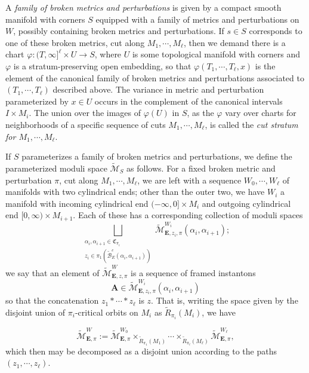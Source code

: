 \documentclass[10pt,a4paper]{amsart}
\theoremstyle{definition}
\theoremstyle{remark}
\numberwithin{figure}{qchap}
\begin{document}
A \emph{family of broken metrics and perturbations} is given by a compact smooth manifold with corners $S$ equipped with a family of metrics and perturbations on $W$, possibly containing broken metrics and perturbations. If $s \in S$ corresponds to one of these broken metrics, cut along $M_1, \cdots, M_\ell$, then we demand there is a chart $\varphi: (T, \infty]^\ell \times U \to S$, where $U$ is some topological manifold with corners and $\varphi$ is a stratum-preserving open embedding, so that $\varphi(T_1, \cdots, T_\ell, x)$ is the element of the canonical family of broken metrics and perturbations associated to $(T_1, \cdots, T_\ell)$ described above. The variance in metric and perturbation parameterized by $x \in U$ occurs in the complement of the canonical intervals $I \times M_i$. The union over the images of $\varphi(U)$ in $S$, as the $\varphi$ vary over charts for neighborhoods of a specific sequence of cuts $M_1, \cdots, M_\ell$, is called the \emph{cut stratum for $M_1, \cdots, M_\ell$}.

If $S$ parameterizes a family of broken metrics and perturbations, we define the parameterized moduli space $\widetilde{\mathcal M}_S$ as follows. For a fixed broken metric and perturbation $\pi$, cut along $M_1, \cdots, M_\ell$, we are left with a sequence $W_0, \cdots, W_\ell$ of manifolds with two cylindrical ends; other than the outer two, we have $W_i$ a manifold with incoming cylindrical end $(-\infty, 0] \times M_i$ and outgoing cylindrical end $[0,\infty)\times M_{i+1}$. Each of these has a corresponding collection of moduli spaces $$\bigsqcup_{\substack{\alpha_i, \alpha_{i+1} \in \mathfrak C_{\pi_i}\\ z_i \in \pi_1(\widetilde{\mathcal B}^e_E(\alpha_i, \alpha_{i+1}))}}\widetilde{\mathcal M}^{W_i}_{\mathbf{E},z_i,\pi}(\alpha_i, \alpha_{i+1});$$ we say that an element of $\widetilde{\mathcal M}^W_{\mathbf{E},z,\pi}$ is a sequence of framed instantons
$$\mathbf{A} \in \widetilde{\mathcal M}^{W_i}_{\mathbf{E},z_i,\pi}(\alpha_i, \alpha_{i+1})$$
so that the concatenation $z_1 * \cdots * z_\ell$ is $z$. That is, writing the space given by the disjoint union of $\pi_i$-critical orbits on $M_i$ as $\widetilde R_{\pi_i}(M_i)$, we have

$$\widetilde{\mathcal M}^W_{\mathbf{E},\pi} := \widetilde{\mathcal M}^{W_0}_{\mathbf{E},\pi} \times_{\widetilde R_{\pi_1}(M_1)} \cdots \times_{\widetilde R_{\pi_\ell}(M_\ell)} \widetilde{\mathcal M}^{W_\ell}_{\mathbf{E},\pi},$$
which then may be decomposed as a disjoint union according to the paths $(z_1, \cdots, z_\ell)$.
\end{document}
